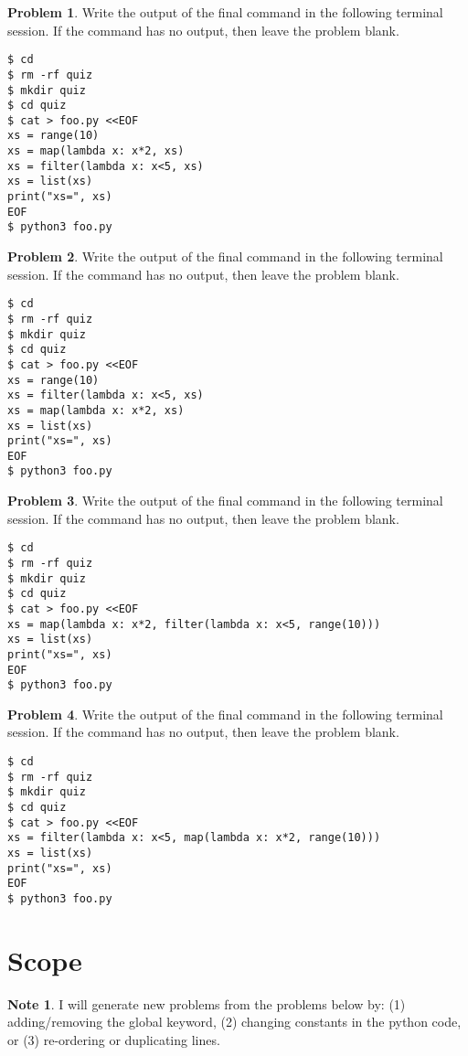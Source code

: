 \documentclass[10pt]{article}
\theoremstyle{definition}
\newtheorem{problem}{Problem}
\newtheorem{note}{Note}
\begin{document}
\begin{problem}
    Write the output of the final command in the following terminal session.
    If the command has no output, then leave the problem blank.
\end{problem}
\begin{lstlisting}
$ cd
$ rm -rf quiz
$ mkdir quiz
$ cd quiz
$ cat > foo.py <<EOF
xs = range(10)
xs = map(lambda x: x*2, xs)
xs = filter(lambda x: x<5, xs)
xs = list(xs)
print("xs=", xs)
EOF
$ python3 foo.py
\end{lstlisting}
\vspace{0.4in}

\begin{problem}
    Write the output of the final command in the following terminal session.
    If the command has no output, then leave the problem blank.
\end{problem}
\begin{lstlisting}
$ cd
$ rm -rf quiz
$ mkdir quiz
$ cd quiz
$ cat > foo.py <<EOF
xs = range(10)
xs = filter(lambda x: x<5, xs)
xs = map(lambda x: x*2, xs)
xs = list(xs)
print("xs=", xs)
EOF
$ python3 foo.py
\end{lstlisting}
\vspace{0.4in}

\begin{problem}
    Write the output of the final command in the following terminal session.
    If the command has no output, then leave the problem blank.
\end{problem}
\begin{lstlisting}
$ cd
$ rm -rf quiz
$ mkdir quiz
$ cd quiz
$ cat > foo.py <<EOF
xs = map(lambda x: x*2, filter(lambda x: x<5, range(10)))
xs = list(xs)
print("xs=", xs)
EOF
$ python3 foo.py
\end{lstlisting}
\vspace{0.4in}

\begin{problem}
    Write the output of the final command in the following terminal session.
    If the command has no output, then leave the problem blank.
\end{problem}
\begin{lstlisting}
$ cd
$ rm -rf quiz
$ mkdir quiz
$ cd quiz
$ cat > foo.py <<EOF
xs = filter(lambda x: x<5, map(lambda x: x*2, range(10)))
xs = list(xs)
print("xs=", xs)
EOF
$ python3 foo.py
\end{lstlisting}
\vspace{0.4in}

\newpage
\section{Scope}
\begin{note}
    I will generate new problems from the problems below by: (1) adding/removing the global keyword, (2) changing constants in the python code, or (3) re-ordering or duplicating lines.
\end{note}
\end{document}

